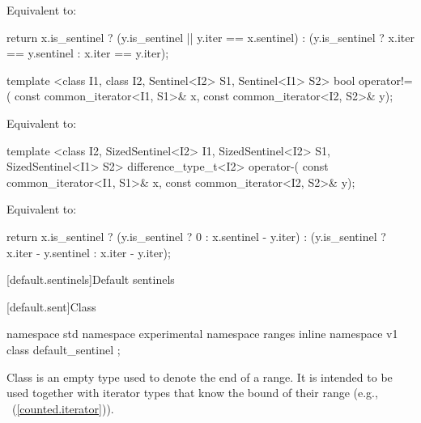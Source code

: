 \begin{itemdescr}
\pnum
\effects Equivalent to:
\begin{codeblock}
  return x.is_sentinel ?
    (y.is_sentinel || y.iter == x.sentinel) :
    (y.is_sentinel ?
        x.iter == y.sentinel :
        x.iter == y.iter);
\end{codeblock}
\end{itemdescr}

%
%
\begin{itemdecl}
template <class I1, class I2, Sentinel<I2> S1, Sentinel<I1> S2>
bool operator!=(
  const common_iterator<I1, S1>& x, const common_iterator<I2, S2>& y);
\end{itemdecl}

\begin{itemdescr}
\pnum
\effects Equivalent to:
\end{itemdescr}

%
%
\begin{itemdecl}
template <class I2, SizedSentinel<I2> I1, SizedSentinel<I2> S1, SizedSentinel<I1> S2>
difference_type_t<I2> operator-(
  const common_iterator<I1, S1>& x, const common_iterator<I2, S2>& y);
\end{itemdecl}

\begin{itemdescr}
\pnum
\effects Equivalent to:
\begin{codeblock}
  return x.is_sentinel ?
    (y.is_sentinel ? 0 : x.sentinel - y.iter) :
    (y.is_sentinel ?
         x.iter - y.sentinel :
         x.iter - y.iter);
\end{codeblock}
\end{itemdescr}

[default.sentinels]{Default sentinels}

[default.sent]{Class }

%
\begin{itemdecl}
namespace std { namespace experimental { namespace ranges { inline namespace v1 {
  class default_sentinel { };
}}}}
\end{itemdecl}

\pnum
Class  is an empty type used to denote the end of a
range. It is intended to be used together with iterator types that know the bound
of their range (e.g., ~(\ref{counted.iterator})).

